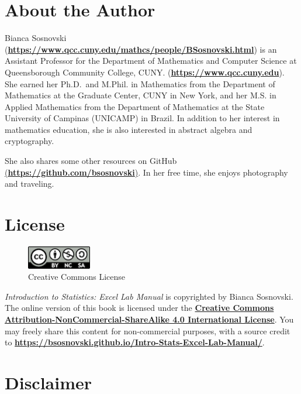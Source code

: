 \documentclass[
]{book}
\begin{document}
\hypertarget{about-the-author}{%
\section*{About the Author}\label{about-the-author}}

Bianca Sosnovski (\textbf{\url{https://www.qcc.cuny.edu/mathcs/people/BSosnovski.html}}) is an Assistant Professor for the Department of Mathematics and Computer Science at Queensborough Community College, CUNY. (\textbf{\url{https://www.qcc.cuny.edu}}). She earned her Ph.D.~and M.Phil. in Mathematics from the Department of Mathematics at the Graduate Center, CUNY in New York, and her M.S. in Applied Mathematics from the Department of Mathematics at the State University of Campinas (UNICAMP) in Brazil. In addition to her interest in mathematics education, she is also interested in abstract algebra and cryptography.

She also shares some other resources on GitHub \href{https://github.com/bsosnovski}{(\textbf{https://github.com/bsosnovski})}. In her free time, she enjoys photography and traveling.

\hypertarget{license}{%
\section*{License}\label{license}}

\begin{figure}
\centering
\includegraphics[width=0.25\textwidth,height=\textheight]{CC-BY-NC-SA.png}
\caption{Creative Commons License}
\end{figure}

\emph{Introduction to Statistics: Excel Lab Manual} is copyrighted by Bianca Sosnovski. The online version of this book is licensed under the \href{http://creativecommons.org/licenses/by-nc-sa/4.0/}{\textbf{Creative Commons Attribution-NonCommercial-ShareAlike 4.0 International License}}. You may freely share this content for non-commercial purposes, with a source credit to \href{https://bsosnovski.github.io/Intro-Stats-Excel-Lab-Manual/}{\textbf{https://bsosnovski.github.io/Intro-Stats-Excel-Lab-Manual/}}.

\hypertarget{disclaimer}{%
\section*{Disclaimer}\label{disclaimer}}
\end{document}
